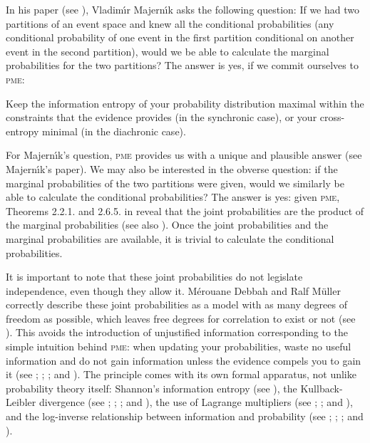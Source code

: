 In his paper  (see ),
Vladim{\'\i}r Majern{\'\i}k asks the following question: If we had two
partitions of an event space and knew all the conditional
probabilities (any conditional probability of one event in the first
partition conditional on another event in the second partition), would
we be able to calculate the marginal probabilities for the two
partitions? The answer is yes, if we commit ourselves to \textsc{pme}:

\begin{quotex}
   Keep the information entropy of your probability
  distribution maximal within the constraints that the evidence
  provides (in the synchronic case), or your cross-entropy minimal (in
  the diachronic case).
\end{quotex}

For Majern{\'\i}k's question, \textsc{pme} provides us with a unique
and plausible answer (see Majern{\'\i}k's paper). We may also be
interested in the obverse question: if the marginal probabilities of
the two partitions were given, would we similarly be able to calculate
the conditional probabilities? The answer is yes: given \textsc{pme},
Theorems 2.2.1. and 2.6.5. in  reveal that
the joint probabilities are the product of the marginal probabilities
(see also ). Once the joint probabilities
and the marginal probabilities are available, it is trivial to
calculate the conditional probabilities.

It is important to note that these joint probabilities do not
legislate independence, even though they allow it. M{\'e}rouane Debbah
and Ralf M{\"u}ller correctly describe these joint probabilities as a
model with as many degrees of freedom as possible, which leaves free
degrees for correlation to exist or not (see
). This avoids the introduction of
unjustified information corresponding to the simple intuition behind
\textsc{pme}: when updating your probabilities, waste no useful
information and do not gain information unless the evidence compels
you to gain it (see ;
; ; and
). The principle comes with its own
formal apparatus, not unlike probability theory itself: Shannon's
information entropy (see ), the Kullback-Leibler
divergence (see ;
; ; and
), the use of Lagrange multipliers (see
; ; and
), and the log-inverse relationship
between information and probability (see ;
; ; and
). 

